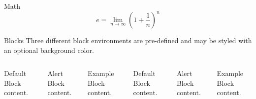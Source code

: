 \begin{frame}{Math}
  \begin{equation*}
    e = \lim_{n\to \infty} \left(1 + \frac{1}{n} \right)^n
  \end{equation*}
\end{frame}

\begin{frame}{Blocks}
  Three different block environments are pre-defined and may be styled with an
  optional background color.

  \begin{columns}[T,onlytextwidth]
      \begin{block}{Default}
        Block content.
      \end{block}

      \begin{alertblock}{Alert}
        Block content.
      \end{alertblock}

      \begin{exampleblock}{Example}
        Block content.
      \end{exampleblock}



      \begin{block}{Default}
        Block content.
      \end{block}

      \begin{alertblock}{Alert}
        Block content.
      \end{alertblock}

      \begin{exampleblock}{Example}
        Block content.
      \end{exampleblock}

  \end{columns}
\end{frame}

